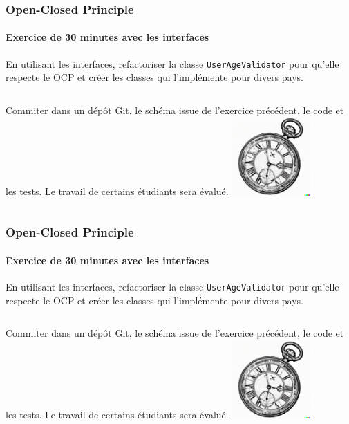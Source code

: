 \documentclass{beamer}
\begin{document}
    \begin{frame}
        \transdissolve
        \frametitle{Open-Closed Principle}
        \framesubtitle{Exercice \execcounterdispinc{} de 30 minutes avec les interfaces}
        En utilisant les interfaces, refactoriser la classe \lstinline{UserAgeValidator} pour qu'elle respecte le OCP et créer les classes qui l'implémente pour divers pays.
        \bigbreak
        \begin{columns}
            Commiter dans un dépôt Git, le schéma issue de l'exercice précédent, le code et les tests.
            \bigbreak
            Le travail de certains étudiants sera évalué.
            \centering
            \includegraphics[width=3cm]{image/engraving-of-an-old-watch}
        \end{columns}
    \end{frame}

    \begin{frame}
        \transdissolve
        \frametitle{Open-Closed Principle}
        \framesubtitle{Exercice \execcounterdispinc{} de 30 minutes avec les interfaces}
        En utilisant les interfaces, refactoriser la classe \lstinline{UserAgeValidator} pour qu'elle respecte le OCP et créer les classes qui l'implémente pour divers pays.
        \bigbreak
        \begin{columns}
            Commiter dans un dépôt Git, le schéma issue de l'exercice précédent, le code et les tests.
            \bigbreak
            Le travail de certains étudiants sera évalué.
            \centering
            \includegraphics[width=3cm]{image/engraving-of-an-old-watch}
        \end{columns}
    \end{frame}
\end{document}

